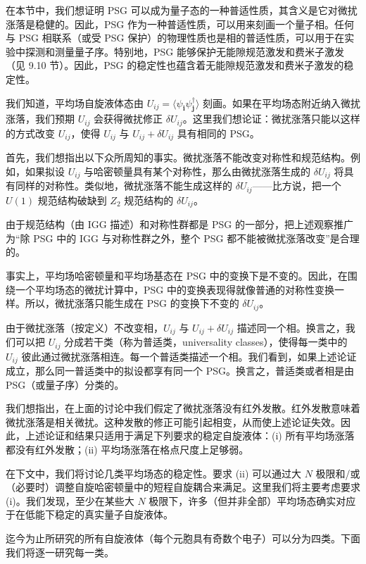 在本节中，我们想证明 PSG 可以成为量子态的一种普适性质，其含义是它对微扰涨落是稳健的。因此，PSG 作为一种普适性质，可以用来刻画一个量子相。任何与 PSG 相联系（或受 PSG 保护）的物理性质也是相的普适性质，可以用于在实验中探测和测量量子序。特别地，PSG 能够保护无能隙规范激发和费米子激发（见 9.10 节）。因此，PSG 的稳定性也蕴含着无能隙规范激发和费米子激发的稳定性。

我们知道，平均场自旋液体态由 $U_{ij}=\langle\psi_{\pmb{i}}\psi_{\pmb{j}}^{\dagger}\rangle$ 刻画。如果在平均场态附近纳入微扰涨落，我们预期 $U_{ij}$ 会获得微扰修正 $\delta U_{ij}$。这里我们想论证：微扰涨落只能以这样的方式改变 $U_{ij}$，使得 $U_{ij}$ 与 $U_{ij}+\delta U_{ij}$ 具有相同的 PSG。

首先，我们想指出以下众所周知的事实。微扰涨落不能改变对称性和规范结构。例如，如果拟设 $U_{ij}$ 与哈密顿量具有某个对称性，那么由微扰涨落生成的 $\delta U_{ij}$ 将具有同样的对称性。类似地，微扰涨落不能生成这样的 $\delta U_{ij}$——比方说，把一个 $U(1)$ 规范结构破缺到 $Z_2$ 规范结构的 $\delta U_{ij}$。

由于规范结构（由 IGG 描述）和对称性群都是 PSG 的一部分，把上述观察推广为“除 PSG 中的 IGG 与对称性群之外，整个 PSG 都不能被微扰涨落改变”是合理的。

事实上，平均场哈密顿量和平均场基态在 PSG 中的变换下是不变的。因此，在围绕一个平均场态的微扰计算中，PSG 中的变换表现得就像普通的对称性变换一样。所以，微扰涨落只能生成在 PSG 的变换下不变的 $\delta U_{ij}$。

由于微扰涨落（按定义）不改变相，$U_{ij}$ 与 $U_{ij}+\delta U_{ij}$ 描述同一个相。换言之，我们可以把 $U_{ij}$ 分成若干类（称为普适类，universality classes），使得每一类中的 $U_{ij}$ 彼此通过微扰涨落相连。每一个普适类描述一个相。我们看到，如果上述论证成立，那么同一普适类中的拟设都享有同一个 PSG。换言之，普适类或者相是由 PSG（或量子序）分类的。

我们想指出，在上面的讨论中我们假定了微扰涨落没有红外发散。红外发散意味着微扰涨落是相关微扰。这种发散的修正可能引起相变，从而使上述论证失效。因此，上述论证和结果只适用于满足下列要求的稳定自旋液体：(i) 所有平均场涨落都没有红外发散；(ii) 平均场涨落在格点尺度上足够弱。

在下文中，我们将讨论几类平均场态的稳定性。要求 (ii) 可以通过大 $N$ 极限和/或（必要时）调整自旋哈密顿量中的短程自旋耦合来满足。这里我们将主要考虑要求 (i)。我们发现，至少在某些大 $N$ 极限下，许多（但并非全部）平均场态确实对应于在低能下稳定的真实量子自旋液体。

迄今为止所研究的所有自旋液体（每个元胞具有奇数个电子）可以分为四类。下面我们将逐一研究每一类。

